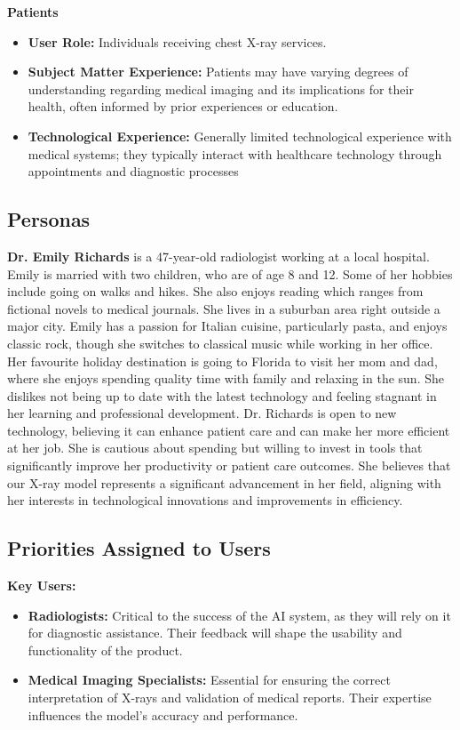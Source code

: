 \documentclass[12pt]{article}
\begin{document}
\textbf{Patients}
\begin{itemize}
    \item {\textbf{User Role: } Individuals receiving chest X-ray services.}
    \item {
        \textbf{Subject Matter Experience: } Patients may have varying degrees of understanding 
        regarding medical imaging and its implications for their health, often informed by prior 
        experiences or education.
    }
    \item {
        \textbf{Technological Experience: } Generally limited technological experience with 
        medical systems; they typically interact with healthcare technology through appointments 
        and diagnostic processes
    }
\end{itemize}

\subsection{Personas}
\textbf{Dr. Emily Richards} is a 47-year-old radiologist working at a local hospital. Emily is 
married with two children, who are of age 8 and 12. Some of her hobbies include going on walks and 
hikes. She also enjoys reading which ranges from fictional novels to medical journals. She lives 
in a suburban area right outside a major city. Emily has a passion for Italian cuisine, 
particularly pasta, and enjoys classic rock, though she switches to classical music while working 
in her office. Her favourite holiday destination is going to Florida to visit her mom and dad, 
where she enjoys spending quality time with family and relaxing in the sun. She dislikes not being 
up to date with the latest technology and feeling stagnant in her learning and professional 
development. Dr. Richards is open to new technology, believing it can enhance patient care and can 
make her more efficient at her job. She is cautious about spending but willing to invest in tools 
that significantly improve her productivity or patient care outcomes. She believes that our X-ray 
model represents a significant advancement in her field, aligning with her interests in 
technological innovations and improvements in efficiency.

\subsection{Priorities Assigned to Users}
\textbf{Key Users:}
\begin{itemize}
    \item{
        \textbf{Radiologists: } Critical to the success of the AI system, as they will rely on 
        it for diagnostic assistance. Their feedback will shape the usability and functionality of 
        the product.
    }
    \item {
        \textbf{Medical Imaging Specialists: } Essential for ensuring the correct interpretation 
        of X-rays and validation of medical reports. Their expertise influences the model's 
        accuracy and performance.
    }
\end{itemize}
\end{document}
